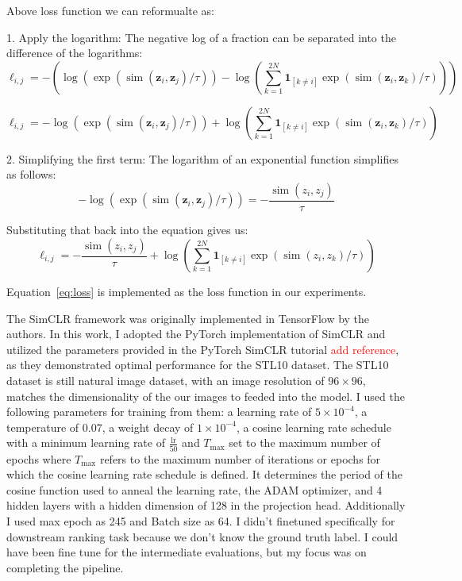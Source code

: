   
Above loss function we can reformualte as:

1. Apply the logarithm: The negative log of a fraction can be separated into the difference of the logarithms:
\[
\ell_{i, j} = -\left( \log \left(\exp \left(\operatorname{sim}\left(\boldsymbol{z}_i, \boldsymbol{z}_j\right) / \tau\right)\right) - \log\left( \sum_{k=1}^{2 N} \mathbf{1}_{[k \neq i]} \exp \left(\operatorname{sim}\left(\boldsymbol{z}_i, \boldsymbol{z}_k\right) / \tau\right) \right) \right)
\]



\[
\ell_{i, j} = -\log \left(\exp \left(\operatorname{sim}\left(\boldsymbol{z}_i, \boldsymbol{z}_j\right) / \tau\right)\right) + \log \left( \sum_{k=1}^{2 N} \mathbf{1}_{[k \neq i]} \exp \left(\operatorname{sim}\left(\boldsymbol{z}_i, \boldsymbol{z}_k\right) / \tau\right) \right)
\]




2. Simplifying the first term: The logarithm of an exponential function simplifies as follows:
\[
-\log\left(\exp\left(\operatorname{sim}\left(\boldsymbol{z}_i, \boldsymbol{z}_j\right) / \tau\right)\right) = -\frac{\operatorname{sim}\left(z_{i}, z_{j}\right)}{\tau}
\]

Substituting that back into the equation gives us:  
\begin{equation}
\ell_{i, j} = -\frac{\operatorname{sim}\left(z_{i}, z_{j}\right)}{\tau} + \log\left(\sum_{k=1}^{2 N} \mathbf{1}_{[k \neq i]} \exp\left(\operatorname{sim}\left(z_{i}, z_{k}\right) / \tau\right)\right)
\label{eq:loss}
\end{equation}

Equation~\ref{eq:loss} is implemented as the loss function in our experiments.

The SimCLR framework was originally implemented in TensorFlow by the authors. In this work, I adopted the PyTorch implementation of SimCLR and utilized the parameters provided 
in
 the PyTorch SimCLR tutorial \textcolor{red}{add reference}, as they demonstrated optimal performance for the STL10 dataset. The STL10 dataset is still natural image dataset,
  with an image resolution of \( 96 \times 96 \),  matches the dimensionality of the our images to feeded into the model. 
 I used the following parameters for training from them: a learning rate of \( 5 \times 10^{-4} \), a temperature of 0.07, a weight decay of \( 1 \times 10^{-4} \), a cosine learning 
 rate schedule with a minimum learning rate of \( \frac{\text{lr}}{50} \) and \( T_{\text{max}} \) set to the maximum number of epochs where 
 \( T_{\text{max}} \) refers to the maximum number of iterations or epochs for which the cosine learning rate schedule is defined. It determines the period of the cosine function used to anneal the learning rate, the ADAM optimizer, and 4 hidden layers
with a hidden dimension of 128 in the projection head. Additionally I used max epoch as 245 and Batch size as 64. I didn't finetuned specifically for
 downstream ranking task because we don't know the ground truth label. I could have been fine tune for the intermediate evaluations, but my focus was on completing the pipeline. 

